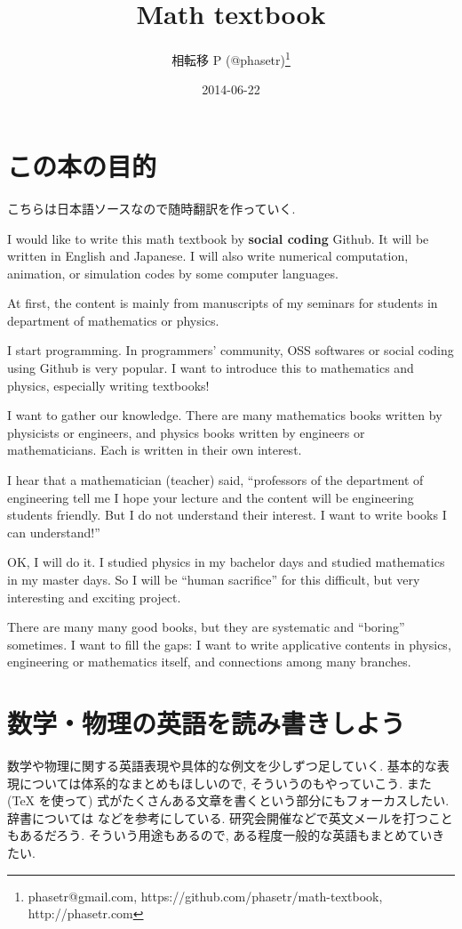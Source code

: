 \documentclass[openany, a4paper, oneside]{jsbook}
\title{Math textbook}
\author{相転移 P (@phasetr)\thanks{phasetr@gmail.com, https://github.com/phasetr/math-textbook, http://phasetr.com}}
\date{2014-06-22}
\theoremstyle{break}
\theoremstyle{breakdefn}
\begin{document}
\maketitle

\setcounter{tocdepth}{10}
\tableofcontents
\vspace*{1cm}

\part{この本の目的}


こちらは日本語ソースなので随時翻訳を作っていく.

I would like to write this math textbook by \textbf{social coding} Github.
It will be written in English and Japanese.
I will also write numerical computation, animation,
or simulation codes by some computer languages.

At first, the content is mainly from manuscripts
of my seminars for students in department of mathematics or physics.

I start programming.
In programmers' community, OSS softwares or social coding using Github
is very popular.
I want to introduce this to mathematics and physics,
especially writing textbooks!

I want to gather our knowledge.
There are many mathematics books written by physicists or engineers,
and physics books written by engineers or mathematicians.
Each is written in their own interest.

I hear that a mathematician (teacher) said,
``professors of the department of engineering tell me
I hope your lecture and the content will be engineering students friendly.
But I do not understand their interest.
I want to write books I can understand!''

OK, I will do it.
I studied physics in my bachelor days and studied mathematics
in my master days.
So I will be ``human sacrifice'' for this difficult, but very
interesting and exciting project.

There are many many good books,
but they are systematic and ``boring'' sometimes.
I want to fill the gaps:
I want to write applicative contents in physics, engineering or mathematics itself,
and connections among many branches.
\part{数学・物理の英語を読み書きしよう}


数学や物理に関する英語表現や具体的な例文を少しずつ足していく.
基本的な表現については体系的なまとめもほしいので, そういうのもやっていこう.
また (\TeX{} を使って) 式がたくさんある文章を書くという部分にもフォーカスしたい.
辞書については \cite{YusakuKomatsu1} などを参考にしている.
研究会開催などで英文メールを打つこともあるだろう.
そういう用途もあるので, ある程度一般的な英語もまとめていきたい.
\end{document}
